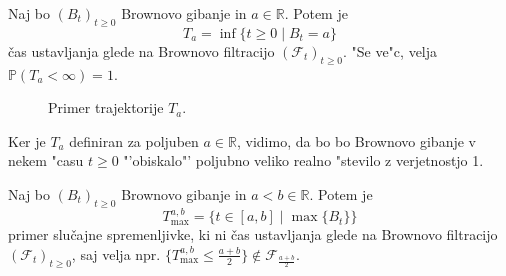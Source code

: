 \documentclass[twoside,11pt]{article}
\begin{document}
\begin{primer}
    Naj bo $(B_t)_{t\geq0}$ Brownovo gibanje in $a \in \mathbb{R}$. Potem je
    $$
        T_a = \inf\{t \geq 0 \mid B_t = a\}
    $$
    čas ustavljanja glede na Brownovo filtracijo $(\mathcal{F}_t)_{t\geq0}$. "Se ve"c, velja $\mathbb{P}(T_a < \infty) = 1$.
\end{primer}

\begin{figure}[h]
    \centering
    \caption{Primer trajektorije $T_a$.}
    \label{fig:slika3}
\end{figure}

\begin{opomba}
    Ker je $T_a$ definiran za poljuben $a \in \mathbb{R}$, vidimo, da bo bo Brownovo gibanje v nekem "casu  $t\geq 0$ "'obiskalo"' poljubno veliko realno "stevilo z verjetnostjo 1.
\end{opomba}

\begin{primer}
    Naj bo $(B_t)_{t\geq0}$ Brownovo gibanje in $a < b \in \mathbb{R}$. Potem je
    $$
        T^{a, b}_{\max} = \{t \in [a, b] \mid \max\{B_t\} \}
    $$
    primer slučajne spremenljivke, ki ni čas ustavljanja glede na Brownovo filtracijo $(\mathcal{F}_t)_{t\geq0}$, saj velja npr. $\{T^{a, b}_{\max} \leq \tfrac{a+b}{2}\} \not\in \mathcal{F}_{\tfrac{a+b}{2}}$.
\end{primer}
\end{document}
